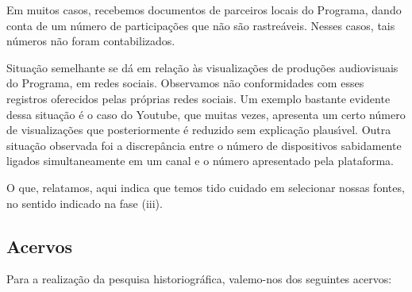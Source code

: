 \documentclass[
12pt,		%
openright,	%
twoside,  %
a4paper,			%
chapter=TITLE,		%
english,			%
french,				%
spanish,			%
brazil				%
]{USPSC-classe/USPSC}
\begin{document}
Em muitos casos, recebemos documentos de parceiros locais do Programa, dando conta de um n\'umero de participa\c{c}\~oes que n\~ao s\~ao rastre\'aveis. Nesses casos, tais n\'umeros n\~ao foram contabilizados.

















Situa\c{c}\~ao semelhante se d\'a em rela\c{c}\~ao \`as visualiza\c{c}\~oes de produ\c{c}\~oes audiovisuais do Programa, em redes sociais. Observamos n\~ao conformidades com esses registros oferecidos pelas pr\'oprias redes sociais. Um exemplo bastante evidente dessa situa\c{c}\~ao \'e o caso do Youtube, que muitas vezes, apresenta um certo n\'umero de visualiza\c{c}\~oes que posteriormente \'e reduzido sem explica\c{c}\~ao plaus\'{\i}vel. Outra situa\c{c}\~ao observada foi a discrep\^ancia entre o n\'umero de dispositivos sabidamente ligados simultaneamente em um canal e o n\'umero apresentado pela plataforma.

















O que, relatamos, aqui indica que temos tido cuidado em selecionar nossas fontes, no sentido indicado na fase (iii).

















\subsection[Acervos]{Acervos}\label{Acervos}
Para a realiza\c{c}\~ao da pesquisa historiogr\'afica, valemo-nos dos seguintes acervos:
\end{document}

